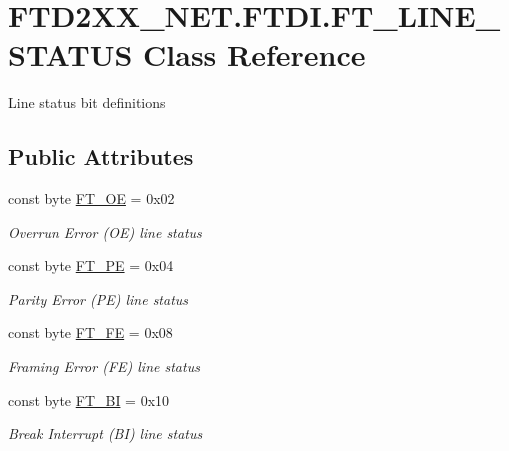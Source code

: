 \hypertarget{class_f_t_d2_x_x___n_e_t_1_1_f_t_d_i_1_1_f_t___l_i_n_e___s_t_a_t_u_s}{}\section{F\+T\+D2\+X\+X\+\_\+\+N\+E\+T.\+F\+T\+D\+I.\+F\+T\+\_\+\+L\+I\+N\+E\+\_\+\+S\+T\+A\+T\+US Class Reference}
\label{class_f_t_d2_x_x___n_e_t_1_1_f_t_d_i_1_1_f_t___l_i_n_e___s_t_a_t_u_s}


Line status bit definitions  


\subsection*{Public Attributes}
\begin{DoxyCompactItemize}
\item 
const byte \mbox{\hyperlink{class_f_t_d2_x_x___n_e_t_1_1_f_t_d_i_1_1_f_t___l_i_n_e___s_t_a_t_u_s_a62856ea2748cc549a8efebc2b386e709}{F\+T\+\_\+\+OE}} = 0x02
\begin{DoxyCompactList}\small\item\em Overrun Error (OE) line status \end{DoxyCompactList}\item 
const byte \mbox{\hyperlink{class_f_t_d2_x_x___n_e_t_1_1_f_t_d_i_1_1_f_t___l_i_n_e___s_t_a_t_u_s_a4457aaf198f118dfe34d0627832a829c}{F\+T\+\_\+\+PE}} = 0x04
\begin{DoxyCompactList}\small\item\em Parity Error (PE) line status \end{DoxyCompactList}\item 
const byte \mbox{\hyperlink{class_f_t_d2_x_x___n_e_t_1_1_f_t_d_i_1_1_f_t___l_i_n_e___s_t_a_t_u_s_a84ae81fd393ba67e9628ad900a75a4db}{F\+T\+\_\+\+FE}} = 0x08
\begin{DoxyCompactList}\small\item\em Framing Error (FE) line status \end{DoxyCompactList}\item 
const byte \mbox{\hyperlink{class_f_t_d2_x_x___n_e_t_1_1_f_t_d_i_1_1_f_t___l_i_n_e___s_t_a_t_u_s_a43d780980f870a3040a42702dbd3cb97}{F\+T\+\_\+\+BI}} = 0x10
\begin{DoxyCompactList}\small\item\em Break Interrupt (BI) line status \end{DoxyCompactList}\end{DoxyCompactItemize}


